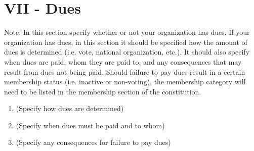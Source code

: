 
\section{VII - Dues}
Note:  In this section specify whether or not your organization has dues.  If
your organization has dues, in this section it should be specified how the
amount of dues is determined (i.e. vote, national organization, etc.).  It
should also specify when dues are paid, whom they are paid to, and any
consequences that may result from dues not being paid.  Should failure to pay
dues result in a certain membership status (i.e. inactive or non-voting), the
membership category will need to be listed in the membership section of the
constitution.
\begin{enumerate}
  \item	(Specify how dues are determined)
  \item	(Specify when dues must be paid and to whom)
  \item	(Specify any consequences for failure to pay dues)
\end{enumerate}

